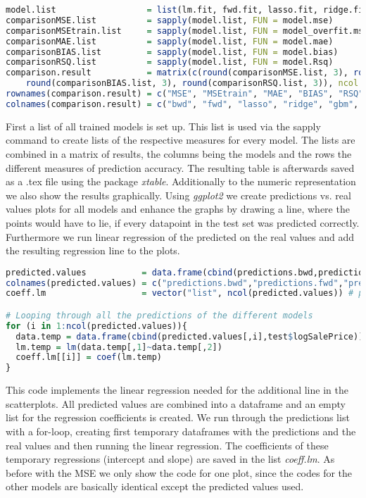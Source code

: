 \begin{lstlisting}[language=R]
model.list                  = list(lm.fit, fwd.fit, lasso.fit, ridge.fit, gbmtuned, rftuned)
comparisonMSE.list          = sapply(model.list, FUN = model.mse)
comparisonMSEtrain.list     = sapply(model.list, FUN = model_overfit.mse)
comparisonMAE.list          = sapply(model.list, FUN = model.mae)
comparisonBIAS.list         = sapply(model.list, FUN = model.bias)
comparisonRSQ.list          = sapply(model.list, FUN = model.Rsq)
comparison.result           = matrix(c(round(comparisonMSE.list, 3), round(comparisonMSEtrain.list, 3), round(comparisonMAE.list, 3), 
    round(comparisonBIAS.list, 3), round(comparisonRSQ.list, 3)), ncol = length(model.list), byrow = TRUE)
rownames(comparison.result) = c("MSE", "MSEtrain", "MAE", "BIAS", "RSQ")
colnames(comparison.result) = c("bwd", "fwd", "lasso", "ridge", "gbm", "rf")
\end{lstlisting}
First a list of all trained models is set up. This list is used via the sapply command to create lists of the respective measures for every model. The lists are combined in a matrix of results, the columns being the models and the rows the different measures of prediction accuracy. The resulting table is afterwards saved as a .tex file using the package \textit{xtable}. Additionally to the numeric representation we also show the results graphically. Using \textit{ggplot2} we create predictions vs. real values plots for all models and enhance the graphs by drawing a line, where the points would have to lie, if every datapoint in the test set was predicted correctly. Furthermore we run linear regression of the predicted on the real values and add the resulting regression line to the plots. 
\begin{lstlisting}[language=R]
predicted.values           = data.frame(cbind(predictions.bwd,predictions.fwd,predictions.lasso,predictions.ridge,predictions.rf,predictions.gbm))
colnames(predicted.values) = c("predictions.bwd","predictions.fwd","predictions.lasso","predictions.ridge","predictions.rf","predictions.gbm")
coeff.lm                   = vector("list", ncol(predicted.values)) # preparing an empty list for coefficients of regression

# Looping through all the predictions of the different models
for (i in 1:ncol(predicted.values)){
  data.temp = data.frame(cbind(predicted.values[,i],test$logSalePrice))
  lm.temp = lm(data.temp[,1]~data.temp[,2])
  coeff.lm[[i]] = coef(lm.temp)
}
\end{lstlisting}
This code implements the linear regression needed for the additional line in the scatterplots. All predicted values are combined into a dataframe and an empty list for the regression coefficients is created. We run through the predictions list with a for-loop, creating first temporary dataframes with the predictions and the real values and then running the linear regression. The coefficients of these temporary regressions (intercept and slope) are saved in the list \textit{coeff.lm}. As before with the MSE we only show the code for one plot, since  the codes for the other models are basically identical except the predicted values used.
